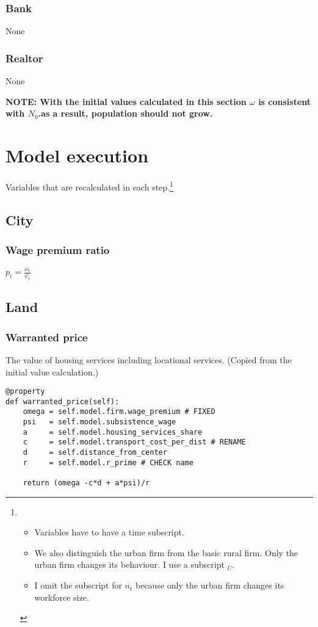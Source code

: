 \subsubsection{Bank}
\begin{description}
\item[None] 
\end{description}

\subsubsection{Realtor}
\begin{description}
\item[None] 
\end{description}


\textbf{NOTE: With the initial values calculated in this section $\omega$ is consistent with $N_0$.as a result, population should not grow. }





\section{Model execution}
Variables that are recalculated in each step.\footnote{\begin{itemize}
    \item Variables have to have a time subscript. 
    \item We also distinguish the urban firm from the basic rural firm.  Only the urban firm changes its behaviour.  I use a subscript $_U$. 
    \item I omit the subscript for $n_t$ because only the urban firm changes its workforce size.
\end{itemize} }


\subsection{City}
\subsubsection{Wage premium ratio}

$p_t= \frac{\omega_t}{\psi_t}$ 


    \subsection{Land}
\subsubsection{Warranted price} The value of housing services including locational services. (Copied from the initial value calculation.)
\begin{lstlisting}
@property
def warranted_price(self):
    omega = self.model.firm.wage_premium # FIXED
    psi   = self.model.subsistence_wage
    a     = self.model.housing_services_share
    c     = self.model.transport_cost_per_dist # RENAME
    d     = self.distance_from_center
    r     = self.model.r_prime # CHECK name
  
    return (omega -c*d + a*psi)/r
\end{lstlisting}


